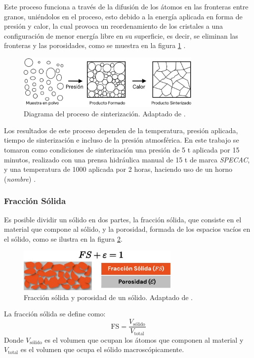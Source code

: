 \documentclass[../main.tex]{subfiles}
\begin{document}
Este proceso funciona a través de la difusión de los átomos en las fronteras entre granos, uniéndolos en el proceso, esto debido a la energía aplicada en forma de presión y calor, la cual provoca un reordenamiento de los cristales a una configuración de menor energía libre en su superficie, es decir, se eliminan las fronteras y las porosidades, como se muestra en la figura \ref{fig:sintdiag} \cite{Ou2014}.
\begin{figure}[H]
    \centering
    \includegraphics[width=0.8\textwidth]{fig/sintdiag.jpg}
    \caption{Diagrama del proceso de sinterización. Adaptado de \cite{Ou2014}.}
    \label{fig:sintdiag}
\end{figure}

Los resultados de este proceso dependen de la temperatura, presión aplicada, tiempo de sinterización e incluso de la presión atmosférica. En este trabajo se tomaron como condiciones de sinterización una presión de 5 t aplicada por 15 minutos, realizado con una prensa hidráulica manual de 15 t de marca \textit{SPECAC}, y una temperatura de 1000\gradoC{} aplicada por 2 horas, haciendo uso de un horno (\textit{nombre}) \cite{Aparnadevi2016}.

\subsubsection{Fracción Sólida}
Es posible dividir un sólido en dos partes, la fracción sólida, que consiste en el material que compone al sólido, y la porosidad, formada de los espacios vacíos en el sólido, como se ilustra en la figura \ref{fig:fracsolida}. 
\begin{figure}[H]
    \centering
    \includegraphics[width=0.7\textwidth]{fig/fracsolida.jpg}
    \caption{Fracción sólida y porosidad de un sólido. Adaptado de \cite{Erklaert2024}.}
    \label{fig:fracsolida}
\end{figure}
La fracción sólida se define como:
\begin{equation}
    \text{FS}=\dfrac{V_\text{sólido}}{V_\text{total}}
    \label{eq:fracsolida}
\end{equation}
Donde $V_\text{sólido}$ es el volumen que ocupan los átomos que componen al material y $V_\text{total}$ es el volumen que ocupa el sólido macroscópicamente.
\end{document}

